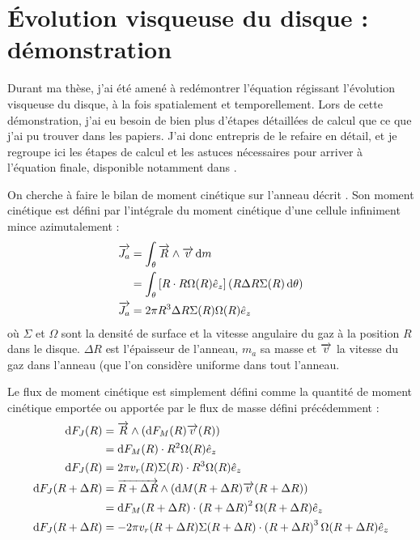 \chapter{Évolution visqueuse du disque : démonstration}\label{app:equation_angular_momentum}
Durant ma thèse, j'ai été amené à redémontrer l'équation régissant l'évolution visqueuse du disque, à la fois spatialement et temporellement. Lors de cette démonstration, j'ai eu besoin de bien plus d'étapes détaillées de calcul que ce que j'ai pu trouver dans les papiers. J'ai donc entrepris de le refaire en détail, et je regroupe ici les étapes de calcul et les astuces nécessaires pour arriver à l'équation finale, disponible notamment dans \cite{pringle1981accretion}.

\bigskip

On cherche à faire le bilan de moment cinétique sur l'anneau décrit . Son moment cinétique est défini par l'intégrale du moment cinétique d'une cellule infiniment mince azimutalement :
\begin{align}
\vect{J_a} &= \int_\theta \vect{R} \wedge \vect{v} \dif m\nonumber\\
&= \int_\theta \left[R \cdot R\Omega(R)\hat{e}_z\right] (R \Delta R \Sigma(R) \dif \theta) \nonumber\\
\vect{J_a} &= 2\pi R^3 \Delta R \Sigma(R)\Omega(R)\hat{e}_z\label{eq:J_a2}
\end{align}
où $\Sigma$ et $\Omega$ sont la densité de surface et la vitesse angulaire du gaz à la position $R$ dans le disque. $\Delta R$ est l'épaisseur de l'anneau, $m_a$ sa masse et ${\overrightarrow{v}}$ la vitesse du gaz dans l'anneau (que l'on considère uniforme dans tout l'anneau.

Le flux de moment cinétique est simplement défini comme la quantité de moment cinétique emportée ou apportée par le flux de masse défini précédemment  :
\begin{subequations}
\begin{align}
\dif F_J(R) &= \vect{R} \wedge \left(\dif F_M(R) \vect{v}(R)\right)\nonumber\\
 &= \dif F_M(R) \cdot R^2\Omega(R)\hat{e}_z\nonumber\\
\dif F_J(R) &= 2\pi v_r(R) \Sigma(R)\cdot R^3\Omega(R)\hat{e}_z\label{eq:dJ_in2}\\
\dif F_J(R+\Delta R) &= \vect{R+\Delta R} \wedge \left(\dif M(R+\Delta R) \vect{v}(R+\Delta R)\right)\nonumber\\
 &= \dif F_M(R+\Delta R) \cdot \left(R+\Delta R\right)^2\Omega(R+\Delta R)\hat{e}_z\nonumber\\
\dif F_J(R+\Delta R) &= -2\pi v_r(R+\Delta R) \Sigma(R+\Delta R)\cdot \left(R+\Delta R\right)^3\Omega(R+\Delta R)\hat{e}_z\label{eq:dJ_out2}
\end{align}\label{eq:dJ2}
\end{subequations}

